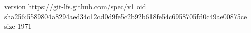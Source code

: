 version https://git-lfs.github.com/spec/v1
oid sha256:5589804a8294aed34c12cd0d9fe5c2b92b618fe54c6958705fd0c49ae00875ce
size 1971
